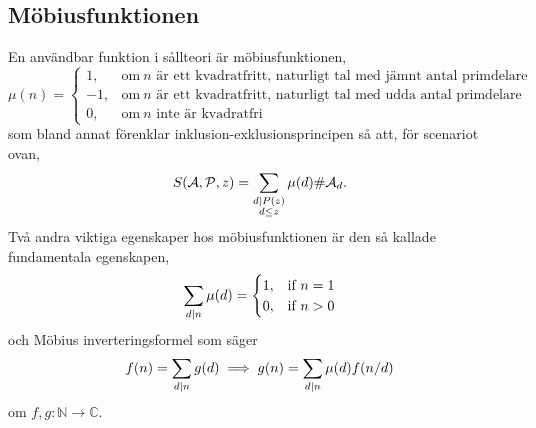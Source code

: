 \subsection{Möbiusfunktionen}
En användbar funktion i sållteori är möbiusfunktionen,
\begin{equation*}
    \mu(n) = 
    \begin{cases}
        1, & \text{om}\ n \text{ är ett kvadratfritt, naturligt tal med jämnt antal primdelare}\\
        -1, & \text{om}\ n \text{ är ett kvadratfritt, naturligt tal med udda antal primdelare}\\
        0, & \text{om}\ n \text{ inte är kvadratfri}
    \end{cases}
\end{equation*}
som bland annat förenklar inklusion-exklusionsprincipen så att, för scenariot ovan,
\begin{align*}
    S(\mathcal{A}, \mathcal{P}, z) = \sum_{\substack{d \mid P(z) \\ d \leq z}} \mu(d) \# \mathcal{A}_d .
\end{align*} %
Två andra viktiga egenskaper hos möbiusfunktionen är den så kallade fundamentala egenskapen,
\begin{equation*}
    \sum_{d \mid n} \mu(d) =
    \begin{cases}
        1, & \text{if}\ n = 1 \\
        0, & \text{if}\ n > 0
    \end{cases}
\end{equation*}
och Möbius inverteringsformel som säger
\begin{equation} \label{mobiusinv}
    f(n) = \sum_{d \mid n} g(d) \implies g(n) = \sum_{d \mid n} \mu(d) f(n/d)
\end{equation}
om \(f, g : \mathbb{N} \to \mathbb{C}\).



